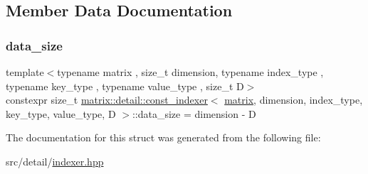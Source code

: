 \subsection{Member Data Documentation}
\mbox{\label{structmatrix_1_1detail_1_1const__indexer_aaed44635b3a2322c6fc204cbd68281fb}} 
\subsubsection{\texorpdfstring{data\+\_\+size}{data\_size}}
{\footnotesize\ttfamily template$<$typename matrix , size\+\_\+t dimension, typename index\+\_\+type , typename key\+\_\+type , typename value\+\_\+type , size\+\_\+t D$>$ \\
constexpr size\+\_\+t \hyperlink{structmatrix_1_1detail_1_1const__indexer}{matrix\+::detail\+::const\+\_\+indexer}$<$ \hyperlink{structmatrix_1_1matrix}{matrix}, dimension, index\+\_\+type, key\+\_\+type, value\+\_\+type, D $>$\+::data\+\_\+size = dimension -\/ D\hspace{0.3cm}{\ttfamily [static]}}



The documentation for this struct was generated from the following file\+:\begin{DoxyCompactItemize}
\item 
src/detail/\hyperlink{indexer_8hpp}{indexer.\+hpp}\end{DoxyCompactItemize}
